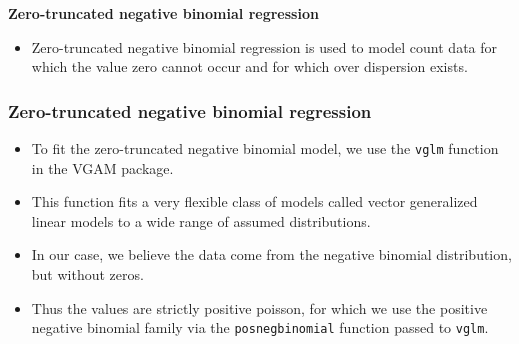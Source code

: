 \documentclass[MASTER.tex]{subfiles}
\begin{document}
	

	\begin{frame}[fragile]
			\Large
	\textbf{Zero-truncated negative binomial regression}
\large
		\begin{itemize}
\item	Zero-truncated negative binomial regression is used to model count data for which the value zero cannot occur and for which over dispersion exists.
		\end{itemize}


%
\end{frame}
%
\begin{frame}
\frametitle{Zero-truncated negative binomial regression}
\begin{itemize}
\item 
	To fit the zero-truncated negative binomial model, we use the \texttt{vglm} function in the VGAM package. 
\item This function fits a very flexible class of models called vector generalized linear models to a wide range of assumed distributions. 
\item In our case, we believe the data come from the negative binomial distribution, but without zeros. 
\item Thus the values are strictly positive poisson, for which we use the positive negative binomial family via the \texttt{posnegbinomial} function passed to \texttt{vglm}.
\end{itemize}
\end{frame}
\end{document}

